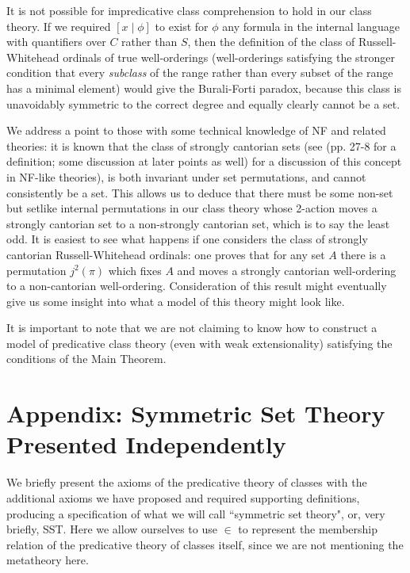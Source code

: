 \documentclass[12pt]{article}
\begin{document}
It is not possible for impredicative class comprehension to hold in our class theory.   If we required $[x\mid \phi]$ to exist for $\phi$ any formula in the internal language with quantifiers
over $C$ rather than $S$, then the definition of the class of Russell-Whitehead ordinals of true well-orderings (well-orderings satisfying the stronger condition that every {\em subclass\/} of the range rather than every subset of the range has a minimal element) would give the Burali-Forti paradox, because this class is unavoidably symmetric to the correct degree and equally clearly cannot be a set.

We address a point to those with some technical knowledge of NF and related theories:  it is known that the class of strongly cantorian sets (see \cite{forsterbook} (pp. 27-8 for a definition; some discussion at later points as well) for a discussion of this concept in NF-like theories), is both invariant under set permutations, and cannot consistently be a set.   This allows us to deduce that there must be some non-set but setlike
internal permutations in our class theory whose 2-action moves a strongly cantorian set to a non-strongly cantorian set, which is to say the least odd.  It is easiest to see what happens if one considers the class of strongly cantorian Russell-Whitehead ordinals:   one proves that for any set $A$ there is a permutation $j^2(\pi)$ which fixes $A$ and moves a strongly cantorian well-ordering to a non-cantorian well-ordering.  Consideration of this result might eventually give us some insight into what a model of this theory might look like.

It is important to note that we are not claiming to know how to construct a model of predicative class theory (even with weak extensionality) satisfying the conditions of the Main Theorem.

\newpage



\section{Appendix:  Symmetric Set Theory Presented Independently}

We briefly present the axioms of the predicative theory of classes with the additional axioms we have proposed and required supporting definitions, producing a specification of what we will call ``symmetric set theory", or, very briefly, SST.  Here we allow ourselves
to use $\in$ to represent the membership relation of the predicative theory of classes itself, since we are not mentioning the metatheory here.
\end{document}
